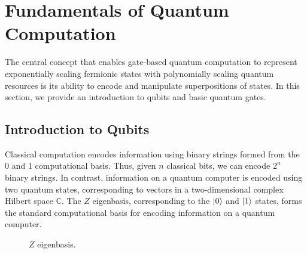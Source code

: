 \section{Fundamentals of Quantum Computation}%
\label{quantum-computation}

The central concept that enables gate-based quantum computation to represent exponentially scaling fermionic states with polynomially scaling quantum resources is its ability to encode and manipulate superpositions of states. In this section, we provide an introduction to qubits and basic quantum gates.

\subsection{Introduction to Qubits}

Classical computation encodes information using binary strings formed from the 0 and 1 computational basis. Thus, given $n$ classical bits, we can encode $2^n$ binary strings. In contrast, information on a quantum computer is encoded using two quantum states, corresponding to vectors in a two-dimensional complex Hilbert space $\mathbb{C}$. The $Z$ eigenbasis, corresponding to the $\ket 0$ and $\ket 1$ states, forms the standard computational basis for encoding information on a quantum computer.

\begin{figure}[H]
    \centering
    \begin{minipage}{.45\textwidth}
        \centering
    \end{minipage}%
    \begin{minipage}{0.45\textwidth}
        \centering
    \end{minipage}
    \caption{$Z$ eigenbasis.}
    \label{z-eigenstates}
\end{figure}


